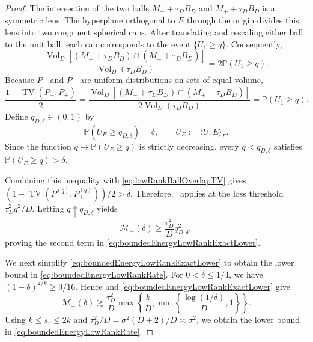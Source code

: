 \documentclass[11pt]{article}
\theoremstyle{definition}
\theoremstyle{remark}
\newcommand{\1}{\boldsymbol{1}}
\begin{document}
\begin{proof}
The intersection of the two balls
\(
M_-+\tau_DB_D
\text{ and }
M_++\tau_DB_D
\)
is a symmetric lens.  The hyperplane orthogonal to $E$ through the origin
divides this lens into two congruent spherical caps.  After translating
and rescaling either ball to the unit ball, each cap corresponds to the
event $\{U_1\geq q\}$.  Consequently,
\[
\frac{
    \operatorname{Vol}_D\!\left[
        (M_-+\tau_DB_D)\cap(M_++\tau_DB_D)
    \right]
}{
    \operatorname{Vol}_D(\tau_DB_D)
}
=
2\mathbb P(U_1\geq q).
\]
Because $P_-$ and $P_+$ are uniform distributions on sets of equal
volume,
\begin{equation} 
\frac{1-\operatorname{TV}(P_-,P_+)}{2}
=
\frac{
    \operatorname{Vol}_D\!\left[
        (M_-+\tau_DB_D)\cap(M_++\tau_DB_D)
    \right]
}{
    2\operatorname{Vol}_D(\tau_DB_D)
} = \mathbb P(U_1\geq q).
\label{eq:lowRankBallOverlapTV}
\end{equation}
Define $q_{D,\delta}\in(0,1)$ by
\begin{equation}
\mathbb P(U_E\geq q_{D,\delta})=\delta,
\qquad
U_E:=\langle U,E\rangle_F.
\label{eq:lowRankCapQuantileDefinition}
\end{equation}
Since the function
\(
q\longmapsto\mathbb P(U_E\geq q)
\)
is strictly decreasing, every $q<q_{D,\delta}$ satisfies
\(
\mathbb P(U_E\geq q)>\delta.
\)


Combining this inequality with
\eqref{eq:lowRankBallOverlapTV} gives
\((1-\operatorname{TV}(P_-^{(q)},P_+^{(q)}))/2>\delta\).
Therefore,~ applies at the loss threshold
$\tau_D^2q^2/D$.  Letting $q\uparrow q_{D,\delta}$ yields
\[
\mathcal M_-(\delta)
\geq
\frac{\tau_D^2}{D}q_{D,\delta}^2,
\]
proving the second term in
\eqref{eq:boundedEnergyLowRankExactLower}.

We next simplify
\eqref{eq:boundedEnergyLowRankExactLower} to obtain the lower bound in
\eqref{eq:boundedEnergyLowRankRate}. For \(0<\delta\le1/4\), we have
\((1-\delta)^{2/k}\ge9/16\). Hence
 and
\eqref{eq:boundedEnergyLowRankExactLower} give
\[
\mathcal M_-(\delta)
\gtrsim
\frac{\tau_D^2}{D}
\max\left\{
    \frac{k}{D},
    \min\left\{\frac{\log(1/\delta)}{D},1\right\}
\right\}.
\]
Using \(k\le s_r\le2k\) and
\(\tau_D^2/D=\sigma^2(D+2)/D\asymp\sigma^2\), we obtain the lower bound
in \eqref{eq:boundedEnergyLowRankRate}.


\end{proof}
\end{document}
